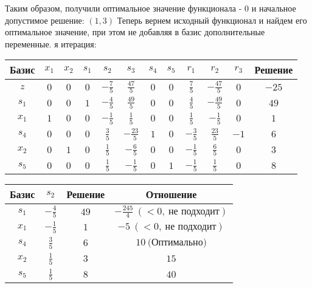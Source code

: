 \documentclass{article}%
\begin{document}
\begin{flushleft}
\begin{tabular}{|c|cccccccccc|c|}
\end{tabular}%
\newline%
\newline%
Таким образом, получили оптимальное значение функционала {-} 0 и начальное допустимое решение: %
$(1, 3)$%
\newline%
Теперь вернем исходный функционал и найдем его оптимальное значение, при этом не добавляя в базис дополнительные переменные.%
я итерация: %
\newline%
\newline%
\renewcommand{\arraystretch}{1.3}%
\begin{tabular}{|c|cccccccccc|c|}%
\hline%
Базис&$x_{1}$&$x_{2}$&$s_{1}$&$s_{2}$&$s_{3}$&$s_{4}$&$s_{5}$&$r_{1}$&$r_{2}$&$r_{3}$&Решение\\%
\hline%
$z$&$0$&$0$&$0$&$-\frac{7}{5}$&$\frac{47}{5}$&$0$&$0$&$\frac{7}{5}$&$-\frac{47}{5}$&$0$&$-25$\\%
\hline%
$s_{1}$&$0$&$0$&$1$&$-\frac{4}{5}$&$\frac{49}{5}$&$0$&$0$&$\frac{4}{5}$&$-\frac{49}{5}$&$0$&$49$\\%
$x_{1}$&$1$&$0$&$0$&$-\frac{1}{5}$&$\frac{1}{5}$&$0$&$0$&$\frac{1}{5}$&$-\frac{1}{5}$&$0$&$1$\\%
$s_{4}$&$0$&$0$&$0$&$\frac{3}{5}$&$-\frac{23}{5}$&$1$&$0$&$-\frac{3}{5}$&$\frac{23}{5}$&$-1$&$6$\\%
$x_{2}$&$0$&$1$&$0$&$\frac{1}{5}$&$-\frac{6}{5}$&$0$&$0$&$-\frac{1}{5}$&$\frac{6}{5}$&$0$&$3$\\%
$s_{5}$&$0$&$0$&$0$&$\frac{1}{5}$&$-\frac{1}{5}$&$0$&$1$&$-\frac{1}{5}$&$\frac{1}{5}$&$0$&$8$\\%
\hline%
\end{tabular}%
\newline%
\newline%
\newline%
\begin{tabular}{|cccc|}%
\hline%
Базис&$s_{2}$&Решение&Отношение\\%
\hline%
$s_{1}$&$-\frac{4}{5}$&$49$&$-\frac{245}{4}\: (< 0, \: \text{не подходит})$\\%
$x_{1}$&$-\frac{1}{5}$&$1$&$-5\: (< 0, \: \text{не подходит})$\\%
$s_{4}$&$\frac{3}{5}$&$6$&$10\: \text{(Оптимально)}$\\%
$x_{2}$&$\frac{1}{5}$&$3$&$15$\\%
$s_{5}$&$\frac{1}{5}$&$8$&$40$\\%
\hline%
\end{tabular}%

\end{flushleft}
\end{document}
